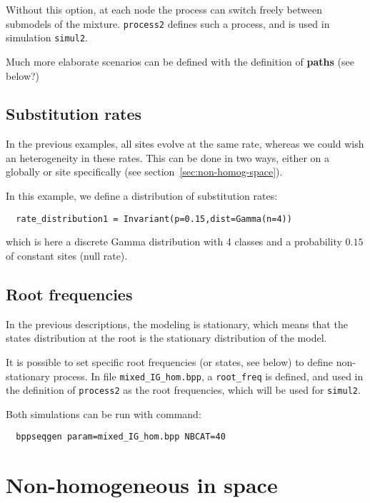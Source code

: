 \documentclass{article}
\begin{document}
Without this option, at each node the process can switch freely
between submodels of the mixture. \texttt{process2} defines such a
process, and is used in simulation \texttt{simul2}.

Much more elaborate scenarios can be defined with the definition of
\textbf{paths} (see below?)


\subsection{Substitution rates}

In the previous examples, all sites evolve at the same rate, whereas
we could wish an heterogeneity in these rates. This can be done in two
ways, either on a globally or site specifically (see
section~\ref{sec:non-homog-space}).

In this example, we define a distribution of substitution rates:

\begin{verbatim}
  rate_distribution1 = Invariant(p=0.15,dist=Gamma(n=4))
\end{verbatim}

which is here a discrete Gamma distribution with 4 classes and a
probability $0.15$ of constant sites (null rate).


\subsection{Root frequencies}

In the previous descriptions, the modeling is stationary, which means
that the states distribution at the root is the stationary
distribution of the model.

It is possible to set specific root frequencies (or states, see below)
to define non-stationary process. In file \verb|mixed_IG_hom.bpp|, a
\verb|root_freq| is defined, and used in the definition of
\texttt{process2} as the root frequencies, which will be used for
\texttt{simul2}.


Both simulations can be run with command:

\begin{verbatim}
  bppseqgen param=mixed_IG_hom.bpp NBCAT=40
\end{verbatim}


\section{\label{sec:non-homog-space}Non-homogeneous in space}
\end{document}
